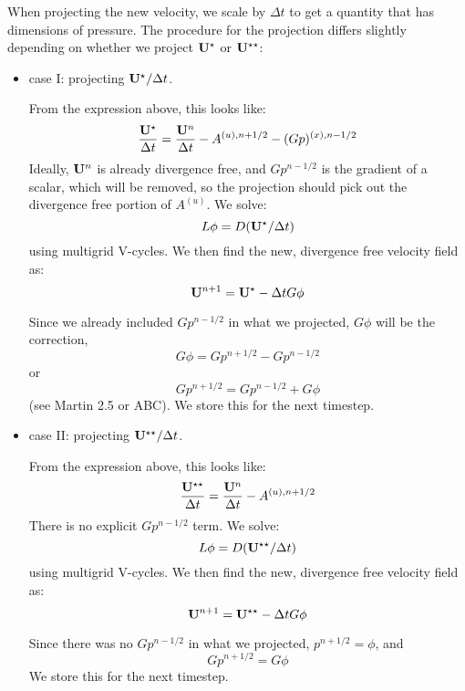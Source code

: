 When projecting the new velocity, we scale by $\Delta t$ to get a quantity
that has dimensions of pressure.  The procedure for the projection
differs slightly depending on whether we project ${\bf U}^\star$ or ${\bf U}^{\star\star}$:
\begin{itemize}
\item case I: projecting ${\bf U}^{\star}/\Delta t$.  

From the expression above,
this looks like:
\begin{equation}
\frac{{\bf U}^\star}{\Delta t} = \frac{{\bf U}^n}{\Delta t} - A^{(u),n+1/2} - (G p)^{(x),n-1/2}
\end{equation}
Ideally, ${\bf U}^n$ is already divergence free, and $Gp^{n-1/2}$ is the
gradient of a scalar, which will be removed, so the projection should
pick out the divergence free portion of $A^{(u)}$.  We solve:
\begin{equation}
L\phi = D ({\bf U}^\star/\Delta t)
\end{equation}
using multigrid V-cycles.
We then find the new, divergence free velocity field as:
\begin{equation}
{\bf U}^{n+1} = {\bf U}^\star - \Delta t G\phi
\end{equation}

Since we already included $Gp^{n-1/2}$ in what we projected, $G\phi$
will be the correction,
\begin{equation}
G\phi = Gp^{n+1/2} - Gp^{n-1/2}
\end{equation}
or
\begin{equation}
Gp^{n+1/2} = Gp^{n-1/2} + G\phi
\end{equation}
(see Martin 2.5 or ABC).  We store this for the next timestep.


\item case II: projecting ${\bf U}^{\star\star}/\Delta t$.  

From the expression above,
this looks like:
\begin{equation}
\frac{{\bf U}^{\star\star}}{\Delta t} = \frac{{\bf U}^n}{\Delta t} - A^{(u),n+1/2} 
\end{equation}
There is no explicit $Gp^{n-1/2}$ term.  We solve:
\begin{equation}
L\phi = D ({\bf U}^{\star\star}/\Delta t)
\end{equation}
using multigrid V-cycles.
We then find the new, divergence free velocity field as:
\begin{equation}
{\bf U}^{n+1} = {\bf U}^{\star\star} - \Delta t G\phi
\end{equation}

Since there was no $Gp^{n-1/2}$ in what we projected, $p^{n+1/2} = \phi$,
and 
\begin{equation}
Gp^{n+1/2} = G\phi
\end{equation}
We store this for the next timestep.
\end{itemize}

